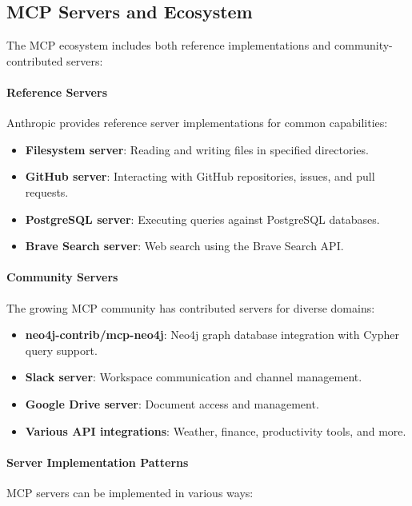 \documentclass[a4paper,twoside]{sapthesis}
\begin{document}
\subsection{MCP Servers and Ecosystem}

The MCP ecosystem includes both reference implementations and community-contributed servers:

\paragraph{Reference Servers}

Anthropic provides reference server implementations for common capabilities:
\begin{itemize}
    \item \textbf{Filesystem server}: Reading and writing files in specified directories.
    \item \textbf{GitHub server}: Interacting with GitHub repositories, issues, and pull requests.
    \item \textbf{PostgreSQL server}: Executing queries against PostgreSQL databases.
    \item \textbf{Brave Search server}: Web search using the Brave Search API.
\end{itemize}

\paragraph{Community Servers}

The growing MCP community has contributed servers for diverse domains:
\begin{itemize}
    \item \textbf{neo4j-contrib/mcp-neo4j}: Neo4j graph database integration with Cypher query support.
    \item \textbf{Slack server}: Workspace communication and channel management.
    \item \textbf{Google Drive server}: Document access and management.
    \item \textbf{Various API integrations}: Weather, finance, productivity tools, and more.
\end{itemize}

\paragraph{Server Implementation Patterns}

MCP servers can be implemented in various ways:
\end{document}
